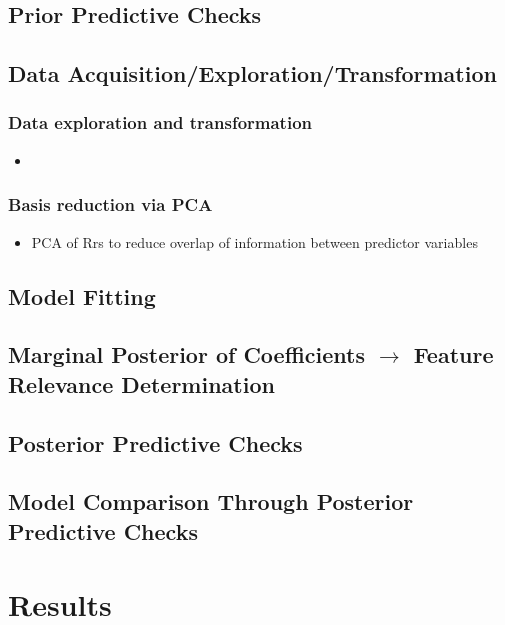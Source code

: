 \documentclass[10pt]{article}
\begin{document}
	\subsection{Prior Predictive Checks}
	
	\subsection{Data Acquisition/Exploration/Transformation}
	    \subsubsection{Data exploration and transformation}
	        \begin{itemize}
	            \item
	        \end{itemize}
		\subsubsection{Basis reduction via PCA}
		    \begin{itemize}
			    \item PCA of Rrs to reduce overlap of information between predictor variables
		    \end{itemize}
	
	\subsection{Model Fitting}
	
	\subsection{Marginal Posterior of Coefficients $\rightarrow$ Feature Relevance Determination}	
	
	\subsection{Posterior Predictive Checks}
	
	\subsection{Model Comparison Through Posterior Predictive Checks}
	

\section{Results}





	
\end{document}

